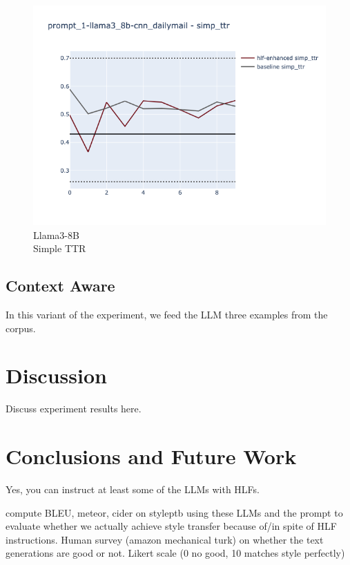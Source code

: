 \documentclass[runningheads,a4paper,11pt]{article}
\begin{document}
\begin{figure}[ht!]
\begin{minipage}{0.32\textwidth}
        \label{fig-gpt-fkgl}
    \end{minipage}
    \hfill
    \begin{minipage}{0.32\textwidth}
        \includegraphics[width=\linewidth]{plots/prompt_1/prompt_1-llama3_8b-cnn_dailymail/prompt_1-llama3_8b-cnn_dailymail_simp_ttr.png}
        \caption[center]{Llama3-8B\\Simple TTR}
        \label{fig-llama-simp-ttr}
    \end{minipage}
\end{figure}

\subsection{Context Aware}

In this variant of the experiment, we feed the LLM three examples from the
corpus.
\section{Discussion}

Discuss experiment results here.


\section{Conclusions and Future Work}

Yes, you can instruct at least some of the LLMs with HLFs.

compute BLEU, meteor, cider on styleptb using these LLMs and the prompt to
evaluate whether we actually achieve style transfer because of/in spite of HLF
instructions.
Human survey (amazon mechanical turk) on whether the text generations are good
or not. Likert scale (0 no good, 10 matches style perfectly)



\end{document}
